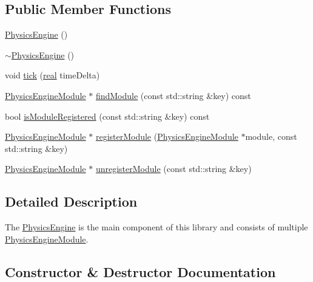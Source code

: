 \subsection*{Public Member Functions}
\begin{DoxyCompactItemize}
\item 
\mbox{\hyperlink{classr3_1_1_physics_engine_a15ef3c7b786475bec9e2afb24d48ffea}{Physics\+Engine}} ()
\item 
\mbox{\hyperlink{classr3_1_1_physics_engine_a37558d625c57485a92a8fc46697fd11c}{$\sim$\+Physics\+Engine}} ()
\item 
void \mbox{\hyperlink{classr3_1_1_physics_engine_aba6b8345f61da6e9e1baa6c745eb1803}{tick}} (\mbox{\hyperlink{namespacer3_ab2016b3e3f743fb735afce242f0dc1eb}{real}} time\+Delta)
\item 
\mbox{\hyperlink{classr3_1_1_physics_engine_module}{Physics\+Engine\+Module}} $\ast$ \mbox{\hyperlink{classr3_1_1_physics_engine_a60779849b362a1b1b43ef2898c90a3ac}{find\+Module}} (const std\+::string \&key) const
\item 
bool \mbox{\hyperlink{classr3_1_1_physics_engine_ad24c27b1288eb3b4d18be70a5e257e4b}{is\+Module\+Registered}} (const std\+::string \&key) const
\item 
\mbox{\hyperlink{classr3_1_1_physics_engine_module}{Physics\+Engine\+Module}} $\ast$ \mbox{\hyperlink{classr3_1_1_physics_engine_aead3d2707fa52fc65701a55b811b571e}{register\+Module}} (\mbox{\hyperlink{classr3_1_1_physics_engine_module}{Physics\+Engine\+Module}} $\ast$module, const std\+::string \&key)
\item 
\mbox{\hyperlink{classr3_1_1_physics_engine_module}{Physics\+Engine\+Module}} $\ast$ \mbox{\hyperlink{classr3_1_1_physics_engine_a54dfdfda1b3f7eb33e9603d247f45aa8}{unregister\+Module}} (const std\+::string \&key)
\end{DoxyCompactItemize}


\subsection{Detailed Description}
The \mbox{\hyperlink{classr3_1_1_physics_engine}{Physics\+Engine}} is the main component of this library and consists of multiple \mbox{\hyperlink{classr3_1_1_physics_engine_module}{Physics\+Engine\+Module}}. 

\subsection{Constructor \& Destructor Documentation}
\mbox{\label{classr3_1_1_physics_engine_a15ef3c7b786475bec9e2afb24d48ffea}} 
